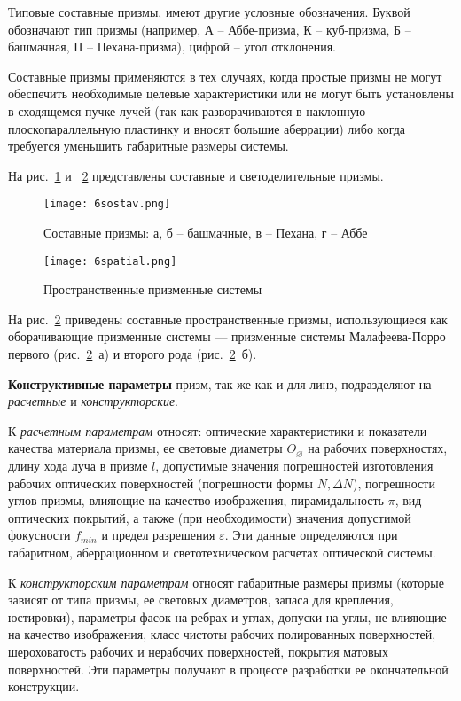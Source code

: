 Типовые составные призмы, имеют другие условные обозначения. Буквой обозначают тип призмы (например, А -- Аббе-призма, К -- куб-призма, Б -- башмачная, П -- Пехана-призма), цифрой -- угол отклонения.

Составные призмы применяются в тех случаях, когда простые призмы не могут обеспечить необходимые целевые характеристики или не могут быть установлены в сходящемся пучке лучей (так как разворачиваются в наклонную плоскопараллельную пластинку и вносят большие аберрации) либо когда требуется уменьшить габаритные размеры системы.

На рис.~\ref{pic:6sostav} и ~\ref{pic:6spatial} представлены составные и светоделительные призмы.
\begin{figure}[h!]
	\caption{ Составные призмы: а, б -- башмачные, в -- Пехана, г -- Аббе }
	\texttt{[image: 6sostav.png]}
	\label{pic:6sostav}
\end{figure}

\begin{figure}[h!]
	\caption{ Пространственные призменные системы }
	\texttt{[image: 6spatial.png]}
	\label{pic:6spatial}
\end{figure}

На рис.~\ref{pic:6spatial} приведены составные пространственные призмы, использующиеся как оборачивающие призменные системы --- призменные системы Малафеева-Порро первого (рис.~\ref{pic:6spatial}~а) и второго рода (рис.~\ref{pic:6spatial}~б).

\textbf{Конструктивные параметры} призм, так же как и для линз, подразделяют на \textit{расчетные} и \textit{конструкторские}.

К \textit{расчетным параметрам} относят: оптические характеристики и показатели качества материала призмы, ее световые диаметры $ O_\varnothing $ на рабочих поверхностях, длину хода луча в призме $ l $, допустимые значения погрешностей изготовления рабочих оптических поверхностей (погрешности формы $ N , \Delta N$), погрешности углов призмы, влияющие на качество изображения, пирамидальность $ \pi $, вид оптических покрытий, а также (при необходимости) значения допустимой фокусности $ f_{min} $ и предел разрешения $ \varepsilon $. Эти данные определяются при габаритном, аберрационном и светотехническом расчетах оптической системы.

К \textit{конструкторским параметрам} относят габаритные размеры призмы (которые зависят от типа призмы, ее световых диаметров, запаса для крепления, юстировки), параметры фасок на ребрах и углах, допуски на углы, не влияющие на качество изображения, класс чистоты рабочих полированных поверхностей, шероховатость рабочих и нерабочих поверхностей, покрытия матовых поверхностей. Эти параметры получают в процессе разработки ее окончательной конструкции.

